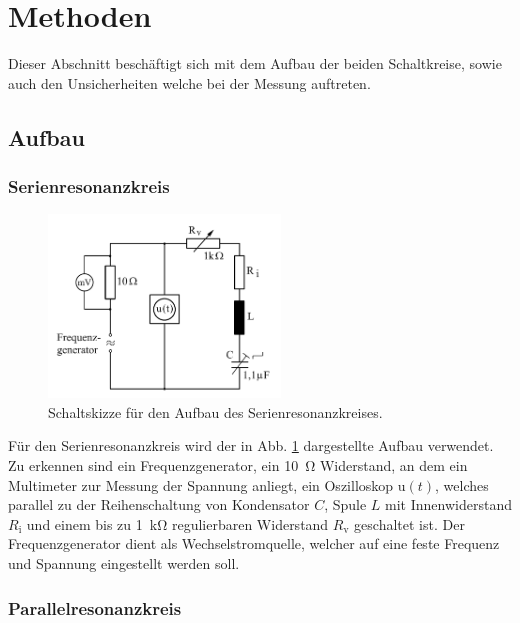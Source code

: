 \section{Methoden}
	
	Dieser Abschnitt beschäftigt sich mit dem Aufbau der beiden Schaltkreise, sowie auch den Unsicherheiten welche bei der Messung auftreten.
	
	\subsection{Aufbau}
			
		\subsubsection{Serienresonanzkreis}
			
			\begin{figure}[ht]
				\centering
				\includegraphics[width=0.55\textwidth]{auswertung/Serienresonanz.PNG}
				\caption{Schaltskizze für den Aufbau des Serienresonanzkreises.\cite{WWU}}
				\label{fig:SerienResonanzSkizze}	
			\end{figure}
			
			Für den Serienresonanzkreis wird der in Abb. \ref{fig:SerienResonanzSkizze} dargestellte Aufbau verwendet.
			Zu erkennen sind ein Frequenzgenerator, ein \SI{10}{\ohm} Widerstand, an dem ein Multimeter zur Messung der Spannung anliegt, ein Oszilloskop u$(t)$, welches parallel zu der Reihenschaltung von Kondensator $C$, Spule $L$ mit Innenwiderstand $R_\text{i}$ und einem bis zu \SI{1}{\kilo\ohm} regulierbaren Widerstand $R_\text{v}$ geschaltet ist.
			Der Frequenzgenerator dient als Wechselstromquelle, welcher auf eine feste Frequenz und Spannung eingestellt werden soll.
			 
		\subsubsection{Parallelresonanzkreis}
			
